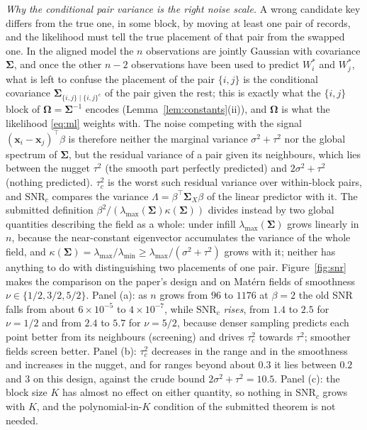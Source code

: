 \documentclass[11pt]{article}
\theoremstyle{definition}
\newcommand{\bx}{\bm{x}}\newcommand{\bg}{\bm{g}}\newcommand{\bw}{\bm{w}}\newcommand{\bz}{\bm{z}}
\newcommand{\bSig}{\boldsymbol{\Sigma}}
\newcommand{\bOm}{\boldsymbol{\Omega}}
\begin{document}
\emph{Why the conditional pair variance is the right noise scale.} A wrong candidate key differs from the true one, in some block, by moving at least one pair of records, and the likelihood must tell the true placement of that pair from the swapped one. In the aligned model the $n$ observations are jointly Gaussian with covariance $\bSig$, and once the other $n-2$ observations have been used to predict $W^\ast_i$ and $W^\ast_j$, what is left to confuse the placement of the pair $\{i,j\}$ is the conditional covariance $\bSig_{\{i,j\}\mid\{i,j\}^c}$ of the pair given the rest; this is exactly what the $\{i,j\}$ block of $\bOm=\bSig^{-1}$ encodes (Lemma~\ref{lem:constants}(ii)), and $\bOm$ is what the likelihood \eqref{eq:ml} weights with. The noise competing with the signal $(\bx_i-\bx_j)^\top\beta$ is therefore neither the marginal variance $\sigma^2+\tau^2$ nor the global spectrum of $\bSig$, but the residual variance of a pair given its neighbours, which lies between the nugget $\tau^2$ (the smooth part perfectly predicted) and $2\sigma^2+\tau^2$ (nothing predicted). $\tau_c^2$ is the worst such residual variance over within-block pairs, and $\mathrm{SNR}_c$ compares the variance $\Lambda=\beta^\top\bSig_X\beta$ of the linear predictor with it. The submitted definition $\beta^2/(\lambda_{\max}(\bSig)\kappa(\bSig))$ divides instead by two global quantities describing the field as a whole: under infill $\lambda_{\max}(\bSig)$ grows linearly in $n$, because the near-constant eigenvector accumulates the variance of the whole field, and $\kappa(\bSig)=\lambda_{\max}/\lambda_{\min}\ge\lambda_{\max}/(\sigma^2+\tau^2)$ grows with it; neither has anything to do with distinguishing two placements of one pair. Figure~\ref{fig:snr} makes the comparison on the paper's design and on Mat\'ern fields of smoothness $\nu\in\{1/2,3/2,5/2\}$. Panel (a): as $n$ grows from $96$ to $1176$ at $\beta=2$ the old SNR falls from about $6\times10^{-5}$ to $4\times10^{-7}$, while $\mathrm{SNR}_c$ \emph{rises}, from $1.4$ to $2.5$ for $\nu=1/2$ and from $2.4$ to $5.7$ for $\nu=5/2$, because denser sampling predicts each point better from its neighbours (screening) and drives $\tau_c^2$ towards $\tau^2$; smoother fields screen better. Panel (b): $\tau_c^2$ decreases in the range and in the smoothness and increases in the nugget, and for ranges beyond about $0.3$ it lies between $0.2$ and $3$ on this design, against the crude bound $2\sigma^2+\tau^2=10.5$. Panel (c): the block size $K$ has almost no effect on either quantity, so nothing in $\mathrm{SNR}_c$ grows with $K$, and the polynomial-in-$K$ condition of the submitted theorem is not needed.
\end{document}
